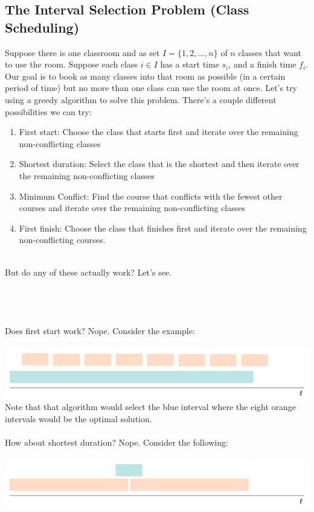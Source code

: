 \documentclass{article}
\begin{document}
\subsection{The Interval Selection Problem (Class Scheduling)}
Suppose there is one classroom and as set $I = \{1, 2, \dots, n\}$ of $n$ classes that want to use the room. Suppose each class $i \in I$ has a start time $s_i$, and a finish time $f_i$. Our goal is to book as many classes into that room as possible (in a certain period of time) but no more than one class can use the room at once. Let's try using a greedy algorithm to solve this problem. There's a couple different possibilities we can try:
\begin{enumerate}
	\item First start: Choose the class that starts first and iterate over the remaining non-conflicting classes
	\item Shortest duration: Select the class that is the shortest and then iterate over the remaining non-conflicting classes
	\item Minimum Conflict: Find the course that conflicts with the fewest other courses and iterate over the remaining non-conflicting classes
	\item First finish: Choose the class that finishes first and iterate over the remaining non-conflicting courses.
\end{enumerate}
\ \\
But do any of these actually work? Let's see.\\\\\\\\\\
Does first start work? Nope. Consider the example:\\\\
\includegraphics[scale=0.3]{ce1.png}\\
Note that that algorithm would select the blue interval where the eight orange intervals would be the optimal solution.\\\\
How about shortest duration? Nope. Consider the following:\\\\
\includegraphics[scale=0.3]{ce2.png}\\
\end{document}
